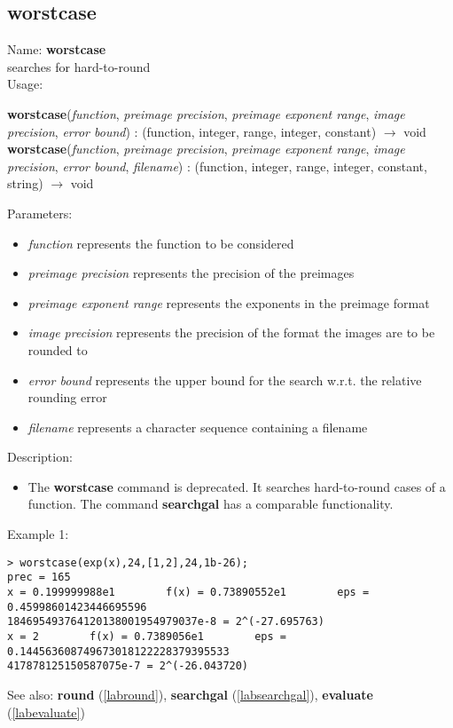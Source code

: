 \subsection{worstcase}
\label{labworstcase}
\noindent Name: \textbf{worstcase}\\
searches for hard-to-round\\

\noindent Usage: 
\begin{center}
\textbf{worstcase}(\emph{function}, \emph{preimage precision}, \emph{preimage exponent range}, \emph{image precision}, \emph{error bound}) : (\textsf{function}, \textsf{integer}, \textsf{range}, \textsf{integer}, \textsf{constant}) $\rightarrow$ \textsf{void}\\
\textbf{worstcase}(\emph{function}, \emph{preimage precision}, \emph{preimage exponent range}, \emph{image precision}, \emph{error bound}, \emph{filename}) : (\textsf{function}, \textsf{integer}, \textsf{range}, \textsf{integer}, \textsf{constant}, \textsf{string}) $\rightarrow$ \textsf{void}\\
\end{center}
Parameters: 
\begin{itemize}
\item \emph{function} represents the function to be considered
\item \emph{preimage precision} represents the precision of the preimages
\item \emph{preimage exponent range} represents the exponents in the preimage format
\item \emph{image precision} represents the precision of the format the images are to be rounded to
\item \emph{error bound} represents the upper bound for the search w.r.t. the relative rounding error
\item \emph{filename} represents a character sequence containing a filename
\end{itemize}
\noindent Description: \begin{itemize}

\item The \textbf{worstcase} command is deprecated. It searches hard-to-round cases of
   a function. The command \textbf{searchgal} has a comparable functionality.
\end{itemize}
\noindent Example 1: 
\begin{center}\begin{minipage}{15cm}\begin{Verbatim}[frame=single]
> worstcase(exp(x),24,[1,2],24,1b-26);
prec = 165
x = 0.199999988e1        f(x) = 0.73890552e1        eps = 0.45998601423446695596
184695493764120138001954979037e-8 = 2^(-27.695763) 
x = 2        f(x) = 0.7389056e1        eps = 0.144563608749673018122228379395533
417878125150587075e-7 = 2^(-26.043720) 

\end{Verbatim}
\end{minipage}\end{center}
See also: \textbf{round} (\ref{labround}), \textbf{searchgal} (\ref{labsearchgal}), \textbf{evaluate} (\ref{labevaluate})
